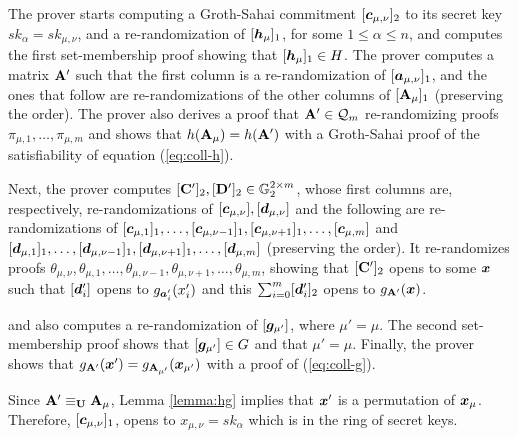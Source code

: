 The prover starts computing a Groth-Sahai commitment $[{\boldsymbol{c}}_{\mu,\nu}]_2$ to its secret key $sk_\alpha=sk_{\mu,\nu}$, and a re-randomization of $[{\boldsymbol{h}}_\mu]_1$, for some $1\leq \alpha \leq n$, and computes the first set-membership proof showing that $[{\boldsymbol{h}}_\mu]_1\in H$.
The prover computes a matrix $\mathbf{{A}}'$ such that the first column is a re-randomization of $[{\boldsymbol{a}}_{\mu,\nu}]_1$, and the ones that follow are re-randomizations of the other columns of $[\mathbf{{A}}_\mu]_1$ (preserving the order). The prover also derives a proof that $\mathbf{{A}}'\in\mathcal{Q}_m$ re-randomizing proofs $\pi_{\mu,1},\ldots,\pi_{\mu,m}$ and shows that $h(\mathbf{{A}}_\mu)=h(\mathbf{{A}}')$ with a Groth-Sahai proof of the satisfiability of equation (\ref{eq:coll-h}).

Next, the prover computes $[\mathbf{{C}}']_2,[\mathbf{{D}}']_2\in\mathbb{G}_2^{2\times m}$, whose first columns are, respectively, re-randomizations of $[{\boldsymbol{c}}_{\mu,\nu}],[{\boldsymbol{d}}_{\mu,\nu}]$ and the following are re-ran\-do\-mi\-za\-tions of $[{\boldsymbol{c}}_{\mu,1}]_1,\ldots,[{\boldsymbol{c}}_{\mu,\nu-1}]_1,\allowbreak[{\boldsymbol{c}}_{\mu,\nu+1}]_1,\ldots,[{\boldsymbol{c}}_{\mu,m}]$ and $[{\boldsymbol{d}}_{\mu,1}]_1,\ldots,[{\boldsymbol{d}}_{\mu,\nu-1}]_1,\allowbreak[{\boldsymbol{d}}_{\mu,\nu+1}]_1,\allowbreak\ldots,[{\boldsymbol{d}}_{\mu,m}]$ (preserving the order). It re-randomizes proofs $\theta_{\mu,\nu},\theta_{\mu,1},\ldots,\allowbreak\theta_{\mu,\nu-1},\theta_{\mu,\nu+1},\ldots,\theta_{\mu,m}$, showing that $[\mathbf{{C}}']_2$ opens to some ${\boldsymbol{x}}$ such that $[{\boldsymbol{d}}_i']$ opens to $g_{{\boldsymbol{a}}'_i}(x'_i)$ and this $\sum_{i=0}^m[{\boldsymbol{d}}'_i]_2$ opens to $g_{\mathbf{{A}}'}({\boldsymbol{x}})$.

and also computes a re-randomization of $[{\boldsymbol{g}}_{\mu'}]$, where $\mu'=\mu$. The second set-membership proof shows that $[{\boldsymbol{g}}_{\mu'}]\in G$ and that $\mu'=\mu$. Finally, the prover shows that $g_{\mathbf{{A}}'}({\boldsymbol{x}}')=g_{\mathbf{{A_{\mu'}}}}({\boldsymbol{x}}_{\mu'})$ with a proof of (\ref{eq:coll-g}).

Since $\mathbf{{A}}'\equiv_{\mathbf{{U}}}\mathbf{{A}}_\mu$, Lemma \ref{lemma:hg} implies that ${\boldsymbol{x}}'$ is a permutation of ${\boldsymbol{x}}_\mu$. Therefore, $[{\boldsymbol{c}}_{\mu,\nu}]_1$, opens to $x_{\mu,\nu}=sk_\alpha$ which is in the ring of secret keys.